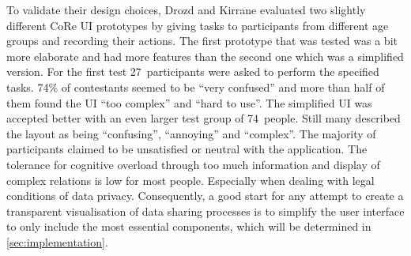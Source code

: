 \documentclass[../paper.tex]{subfiles}
\begin{document}
  To validate their design choices, Drozd and Kirrane evaluated
  two slightly different CoRe UI prototypes by giving tasks to participants
  from different age groups and recording their actions. The first prototype
  that was tested was a bit more elaborate and had more features than the
  second one which was a simplified version. For the first test 27~participants
  were asked to perform the specified tasks. 74\% of contestants
  seemed to be “very confused” and more than half of them found the UI “too
  complex” and “hard to use”. The simplified UI was accepted better with
  an even larger test group of 74~people. Still many described the layout as
  being “confusing”, “annoying” and “complex”. The majority of participants
  claimed to be unsatisfied or neutral with the application. The tolerance for
  cognitive overload through too much information and display of complex
  relations is low for most people. Especially when dealing with legal
  conditions of data privacy. Consequently, a good start for any attempt to
  create a transparent visualisation of data sharing processes is to simplify
  the user interface to only include the most essential components, which will
  be determined in \cref{sec:implementation}.
\end{document}
